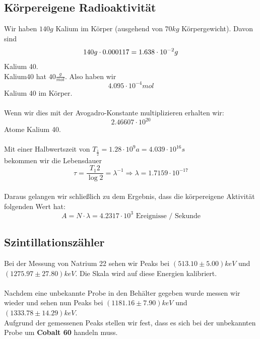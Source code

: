 \documentclass{article}
\begin{document}
\subsection{Körpereigene Radioaktivität}
Wir haben $140g$ Kalium im Körper (ausgehend von $70kg$ Körpergewicht).
Davon sind
$$
140g\cdot 0.000117=1.638\cdot10^{-2}g \\
$$
Kalium 40.\\
Kalium40 hat $40\frac{g}{mol}$. Also haben wir \\
$$4.095\cdot10^{-4}mol$$ Kalium 40 im Körper.\\
\\
Wenn wir dies mit der Avogadro-Konstante multiplizieren erhalten wir:\\
$$2.46607\cdot 10^{20}$$ Atome Kalium 40.\\
\\
Mit einer Halbwertszeit von $T_{\frac{1}{2}}= 1.28 \cdot 10^{9}a=4.039\cdot 10^{16}s$ \\
bekommen wir die Lebensdauer $$\tau=\frac{T_{1}{2}}{\log{2}}=\lambda^{-1} \Rightarrow \lambda=1.7159 \cdot 10^{-17}$$
\\
Daraus gelangen wir schließlich zu dem Ergebnis, dass die körpereigene Aktivität folgenden Wert hat:
$$A=N\cdot \lambda = 4.2317\cdot 10^{3} \textrm{ Ereignisse / Sekunde}$$
\subsection{Szintillationszähler}
Bei der Messung von Natrium 22 sehen wir Peaks bei $(513.10 \pm 5.00)\si{keV}$ und $(1275.97 \pm 27.80)\si{keV}$. Die Skala wird auf diese Energien kalibriert.\\
\\
Nachdem eine unbekannte Probe in den Behälter gegeben wurde messen wir wieder und sehen nun Peaks bei $(1181.16 \pm 7.90)\si{keV}$ und $(1333.78 \pm 14.29)\si{keV}$.\\
Aufgrund der gemessenen Peaks stellen wir fest, dass es sich bei der unbekannten Probe um \textbf{Cobalt 60} handeln muss.
\end{document}
